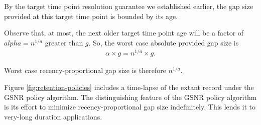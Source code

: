 By the target time point resolution guarantee we established earlier, the gap size provided at this target time point is bounded by its age.

Observe that, at most, the next older target time point age will be a factor of $alpha = n^{1/a}$ greater than $g$.
So, the worst case absolute provided gap size is
\begin{align*}
\alpha \times g = n^{1/a} \times g.
\end{align*}

Worst case recency-proportional gap size is therefore $n^{1/a}$.

Figure \ref{fig:retention-policies} includes a time-lapse of the extant record under the GSNR policy algorithm.
The distinguishing feature of the GSNR policy algorithm is its effort to minimize recency-proportional gap size indefinitely.
This lends it to very-long duration applications.








